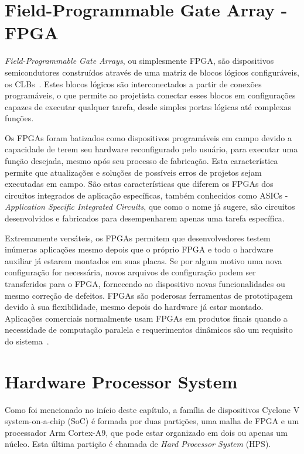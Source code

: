 
\section{Field-Programmable Gate Array - FPGA}
\textit{Field-Programmable Gate Arrays}, ou simplesmente FPGA, são dispositivos semicondutores construídos através de uma matriz de blocos lógicos configuráveis, os CLBs~\cite{FPGAXilinx}. Estes blocos lógicos são interconectados a partir de conexões programáveis, o que permite ao projetista conectar esses blocos em configurações capazes de executar qualquer tarefa, desde simples portas lógicas até complexas funções.

Os FPGAs foram batizados como dispositivos programáveis em campo devido a capacidade de terem seu hardware reconfigurado pelo usuário, para executar uma função desejada, mesmo após seu processo de fabricação. Esta característica permite que atualizações e soluções de possíveis erros de projetos sejam executadas em campo. São estas características que diferem os FPGAs dos circuitos integrados de aplicação específicas, também conhecidos como ASICs - \textit{Application Specific Integrated Circuits}, que como o nome já sugere, são circuitos desenvolvidos e fabricados para desempenharem apenas uma tarefa específica.

Extremamente versáteis, os FPGAs permitem que desenvolvedores testem inúmeras aplicações mesmo depois que o próprio FPGA e todo o hardware auxiliar já estarem montados em suas placas. Se por algum motivo uma nova configuração for necessária, novos arquivos de configuração podem ser transferidos para o FPGA, fornecendo ao dispositivo novas funcionalidades ou mesmo correção de defeitos. FPGAs são poderosas ferramentas de prototipagem devido à sua flexibilidade, mesmo depois do hardware já estar montado. Aplicações comerciais normalmente usam FPGAs em produtos finais quando a necessidade de computação paralela e requerimentos dinâmicos são um requisito do sistema~\cite{FPGAarm}.



\section{Hardware Processor System}
Como foi mencionado no início deste capítulo, a família de dispositivos Cyclone V system-on-a-chip (SoC) é formada por duas partições, uma malha de FPGA e um processador Arm Cortex-A9, que pode estar organizado em dois ou apenas um núcleo. Esta última partição é chamada de \textit{Hard Processor System} (HPS). 

